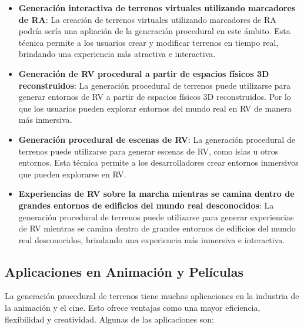 \begin{itemize}
    
    \item \textbf{Generación interactiva de terrenos virtuales utilizando marcadores de RA}: La creación de terrenos virtuales utilizando marcadores de RA podría sería una apliación de la generación procedural en este ámbito. Esta técnica permite a los usuarios crear y modificar terrenos en tiempo real, brindando una experiencia más atractiva e interactiva\cite{ARInteractiveTerrain}.
    
    \item \textbf{Generación de RV procedural a partir de espacios físicos 3D reconstruidos}: La generación procedural de terrenos puede utilizarse para generar entornos de RV a partir de espacios físicos 3D reconstruidos. Por lo que los usuarios pueden explorar entornos del mundo real en RV de manera más inmersiva\cite{ARInteractiveTerrain}.
    
    \item \textbf{Generación procedural de escenas de RV}: La generación procedural de terrenos puede utilizarse para generar escenas de RV, como islas u otros entornos. Esta técnica permite a los desarrolladores crear entornos inmersivos que pueden explorarse en RV\cite{VRSceneGeneration}.
    
    \item \textbf{Experiencias de RV sobre la marcha mientras se camina dentro de grandes entornos de edificios del mundo real desconocidos}: La generación procedural de terrenos puede utilizarse para generar experiencias de RV mientras se camina dentro de grandes entornos de edificios del mundo real desconocidos, brindando una experiencia más inmersiva e interactiva\cite{ProceduralContentCreation}.
\end{itemize}

\subsection{Aplicaciones en Animación y Películas} 

La generación procedural de terrenos tiene muchas aplicaciones en la industria de la animación y el cine. Esto ofrece ventajas como una mayor eficiencia, flexibilidad y creatividad. Algunas de las aplicaciones son:

